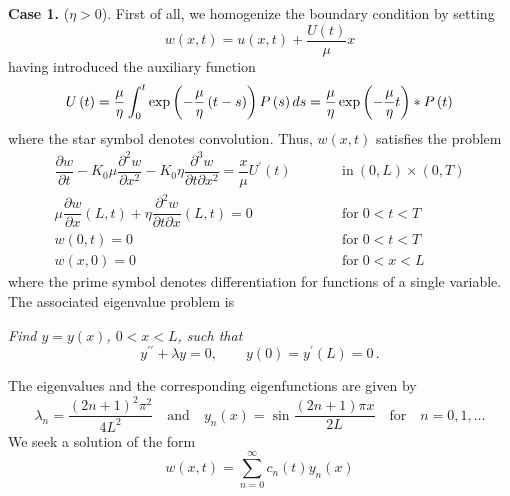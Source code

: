 \documentclass[12pt,a4paper]{amsart}
\theoremstyle{definition}
\begin{document}
{\bf Case 1.} ($\eta >0$). First of all, we homogenize the boundary condition by
setting%
\begin{equation*}
w\left( x,t\right) =u\left( x,t\right) +\frac{U\left( t\right) }{\mu }x
\end{equation*}%
having introduced the auxiliary function
\begin{equation*}
U\left( t\right) =\frac{\mu }{\eta }\int_{0}^{t}\exp \left( -\frac{\mu }{%
\eta }\left( t-s\right) \right) P\left( s\right) ds=\frac{\mu }{\eta }\exp
\left( -\frac{\mu }{\eta }t\right) \ast P\left( t\right)
\end{equation*}%
where the star symbol denotes convolution. Thus, $w\left(
x,t\right) $ satisfies the problem%
\begin{equation}
\begin{array}{rll}
\dfrac{\partial w}{\partial t}-K_{0}\mu \dfrac{\partial ^{2}w}{\partial x^{2}%
}-K_{0}\eta \dfrac{\partial ^{3}w}{\partial t\partial x^{2}}=\dfrac{x}{\mu }%
U^{\prime }\left( t\right)  & \qquad  & \mbox{in}\ (0,L)\times (0,T) \\[3mm]
\mu \dfrac{\partial w}{\partial x}\left( L,t\right) +\eta \dfrac{\partial
^{2}w}{\partial t\partial x}\left( L,t\right) =0 & \qquad  & \mbox{for}%
\;0<t<T \\
w\left( 0,t\right) =0 & \qquad  & \mbox{for}\;0<t<T \\
w\left( x,0\right) =0 & \qquad  & \mbox{for}\;0<x<L%
\end{array}
\label{P_w}
\end{equation}%
where the prime symbol denotes differentiation for functions of a single variable.
The associated eigenvalue
problem is
%
\begin{center}
\it
Find $y=y\left( x\right) $, $0<x<L$, such that%
\begin{equation*}
y^{\prime \prime }+\lambda y=0,\qquad y\left( 0\right) =y^{\prime }\left(
L\right) =0\,.
\end{equation*}%
\end{center}
%
The eigenvalues and the corresponding eigenfunctions are given by
\begin{equation}
\lambda _{n}=\frac{(2n+1)^{2}\pi ^{2}}{4L^{2}}\quad \mbox{and}\quad
y_{n}(x)=\sin \frac{(2n+1)\pi x}{2L}  \label{lambda_y_n}\quad \mbox{for}\quad
n=0,1,\dots
\end{equation}%
We seek a
solution of the form%
\begin{equation*}
w\left( x,t\right) =\sum_{n=0}^{\infty }c_{n}\left( t\right) y_{n}\left(
x\right)
\end{equation*}%
\end{document}
